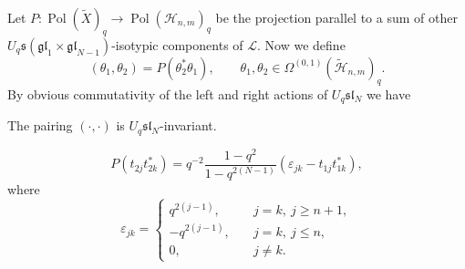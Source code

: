 \documentclass[pdftex]{sigma}
\begin{document}
Let $P: \operatorname{Pol}(\widetilde{X})_q \rightarrow \operatorname{Pol}({\mathscr{H}}_{n,m})_q$ be the
projection parallel to a sum of other $U_q \mathfrak{s}(\mathfrak{gl}_1 \times \mathfrak{gl}_{N-1})$-isotypic components of $\mathcal{L}$. Now we def\/ine
\[
(\theta_1,\theta_2)=P(\theta^*_2\theta_1), \qquad \theta_1,\theta_2 \in \Omega^{(0,1)}(\widetilde{\mathscr{H}}_{n,m})_q.
\]
By obvious commutativity of the left and right actions of $U_q \mathfrak{sl}_N$ we have

\begin{proposition}
The pairing $(\cdot,\cdot)$ is $U_q \mathfrak{sl}_N$-invariant.
\end{proposition}
\begin{lemma}
\[P(t_{2j}t^*_{2k})=q^{-2}\frac{1-q^2}{1-q^{2(N-1)}}(\varepsilon_{jk}-t_{1j}t^*_{1k}),\] where
\[
\varepsilon_{jk}=\begin{cases} q^{2(j-1)}, \quad & j=k, \  j \geq n+1, \\
-q^{2(j-1)}, \quad & j=k, \  j \leq n, \\
0, \quad & j \neq k.
\end{cases}
\]
\end{lemma}
\end{document}
